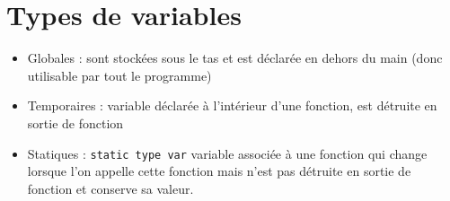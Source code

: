     \section*{Types de variables}
        \begin{itemize}
            \item Globales : sont stockées sous le tas et est déclarée en dehors du main (donc utilisable par tout le programme)
            \item Temporaires : variable déclarée à l'intérieur d'une fonction, est détruite en sortie de fonction
            \item Statiques : \texttt{static type var} variable associée à une fonction qui change lorsque l'on appelle cette fonction mais n'est pas détruite en sortie de fonction et conserve sa valeur.
        \end{itemize}






